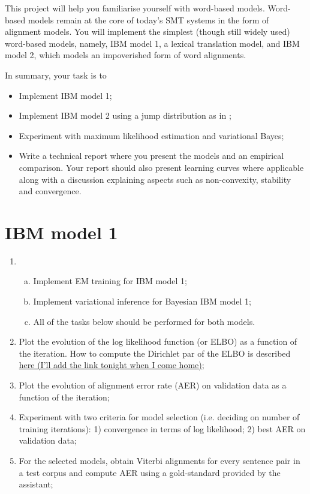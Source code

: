 
This project will help you familiarise yourself with word-based
models.  Word-based models remain at the core of today's SMT systems
in the form of alignment models.
You will implement the simplest (though still widely used) word-based
models, namely, IBM model 1, a lexical translation model, and IBM model 2, which models an impoverished form of word alignments.

In summary, your task is to

\begin{itemize}
	\item Implement IBM model 1;
	\item Implement IBM model 2 using a jump distribution as in \cite{Vogel+1996:HMMWA};
	\item Experiment with maximum likelihood estimation and variational Bayes;
	\item Write a technical report where you present the models and an empirical comparison. Your report should also present learning curves
    where applicable along with a discussion explaining aspects such
    as non-convexity, stability and convergence.
\end{itemize}

\section{IBM model 1}

\begin{enumerate}
	\item 
	\begin{enumerate}[a)]
		\item Implement EM training \citep{Brown+1993:smt} for IBM model 1;
		\item Implement variational inference for Bayesian IBM model 1;
		\item All of the tasks below should be performed for both models.
	\end{enumerate}
	\item Plot the evolution of the log likelihood function (or ELBO) as a function of the iteration. How to compute the Dirichlet par of the ELBO
	is described \href{}{here (I'll add the link tonight when I come home)};
	\item Plot the evolution of alignment error rate (AER) on validation data as a function of the iteration;
	\item Experiment with two criteria for model selection (i.e. deciding on number of training iterations): 1) convergence in terms of log likelihood; 2) best AER on validation data;
	\item For the selected models, obtain Viterbi alignments for every sentence pair in a test corpus and compute AER using a gold-standard provided by the assistant;
\end{enumerate}

